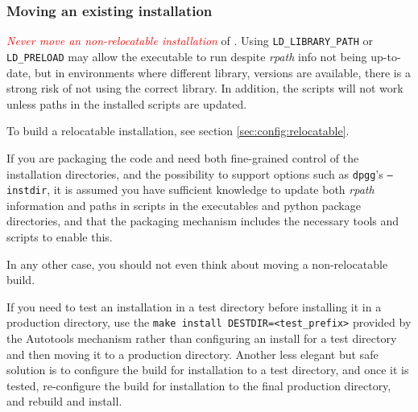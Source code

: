 \documentclass[a4paper,10pt,twoside]{csshortdoc}
\begin{document}
\subsubsection{Moving an existing installation}

\textcolor{Red}{\emph{Never move an non-relocatable installation}} of \CS.
Using \texttt{LD\_LIBRARY\_PATH} or \texttt{LD\_PRELOAD}
may allow the executable to run despite \emph{rpath} info
not being up-to-date, but in environments where different library,
versions are available, there is a strong risk of not using
the correct library. In addition, the scripts will not work
unless paths in the installed scripts are updated.

To build a relocatable installation, see section
\ref{sec:config:relocatable}.

If you are packaging the code and need both fine-grained control of
the installation directories, and the possibility to support
options such as \texttt{dpgg}'s \texttt{--instdir}, it is assumed
you have sufficient knowledge to update both \emph{rpath} information
and paths in scripts in the executables and python package directories,
and that the packaging mechanism includes the necessary tools and
scripts to enable this.

In any other case, you should not even think about moving a
non-relocatable build.

If you need to test an installation in a test directory before
installing it in a production directory, use the
\texttt{make install DESTDIR=<test\_prefix>} provided
by the Autotools mechanism rather than configuring an install for a
test directory and then moving it to a production directory.
Another less elegant but safe solution is to configure the build for
installation to a test directory, and once it is tested,
re-configure the build for installation to the final production
directory, and rebuild and install.
\end{document}
